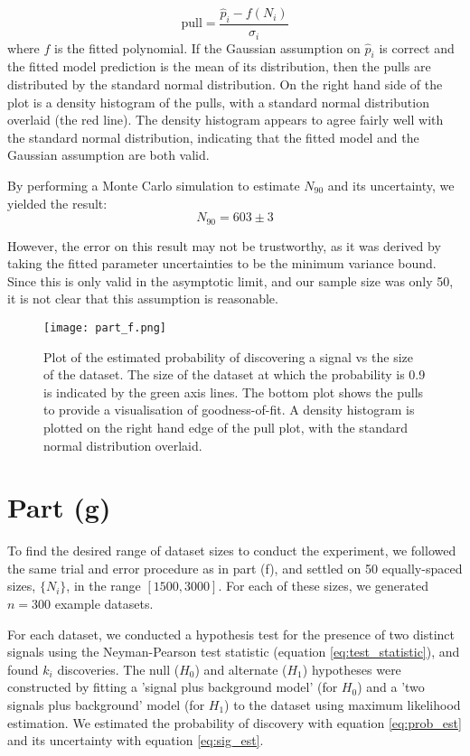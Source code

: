 \documentclass{article}
\begin{document}
\begin{equation}
\text{pull} = \frac{\hat{p}_i - f(N_i)}{\hat{\sigma_i}}
\label{eq:pull}
\end{equation}
where $f$ is the fitted polynomial. If the Gaussian assumption on $\hat{p}_i$ is correct and the fitted model prediction is the mean of its distribution, then the pulls are distributed by the standard normal distribution. On the right hand side of the plot is a density histogram of the pulls, with a standard normal distribution overlaid (the red line). The density histogram appears to agree fairly well with the standard normal distribution, indicating that the fitted model and the Gaussian assumption are both valid.

By performing a Monte Carlo simulation to estimate $N_{90}$ and its uncertainty, we yielded the result:
$$
N_{90} = 603 \pm 3
$$

However, the error on this result may not be trustworthy, as it was derived by taking the fitted parameter uncertainties to be the minimum variance bound. Since this is only valid in the asymptotic limit, and our sample size was only 50, it is not clear that this assumption is reasonable.  

\begin{figure}[h]
\centering
\texttt{[image: part\_f.png]}
\caption{Plot of the estimated probability of discovering a signal vs the size of the dataset. The size of the dataset at which the probability is 0.9 is indicated by the green axis lines. The bottom plot shows the pulls to provide a visualisation of goodness-of-fit. A density histogram is plotted on the right hand edge of the pull plot, with the standard normal distribution overlaid.}
\label{fig:f}
\end{figure} 

\section*{Part (g)}

To find the desired range of dataset sizes to conduct the experiment, we followed the same trial and error procedure as in part (f), and settled on 50 equally-spaced sizes, $\{N_i\}$, in the range $[1500, 3000]$. For each of these sizes, we generated $n = 300$ example datasets. 

For each dataset, we conducted a hypothesis test for the presence of two distinct signals using the Neyman-Pearson test statistic (equation \ref{eq:test_statistic}), and found $k_i$ discoveries. The null ($H_0$) and alternate ($H_1$) hypotheses were constructed by fitting a 'signal plus background model' (for $H_0$) and a 'two signals plus background' model (for $H_1$) to the dataset using maximum likelihood estimation. We estimated the probability of discovery with equation \ref{eq:prob_est} and its uncertainty with equation \ref{eq:sig_est}. 
\end{document}
